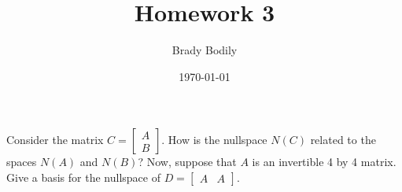 \documentclass[]{exam}
\title{Homework 3\\
	}
\date{ \today 
	}
\author{Brady Bodily
	}
\begin{document}
\maketitle

\printanswers %

\begin{questions}
	\question Consider the matrix $C = \begin{bmatrix} A \\ B \end{bmatrix}$. How is the nullspace $N(C)$ related to the spaces $N(A)$ and $N(B)$? Now, suppose that $A$ is an invertible 4 by 4 matrix. Give a basis for the nullspace of $D = \begin{bmatrix} A & A \end{bmatrix}$. 
	

\end{questions}
\end{document}
